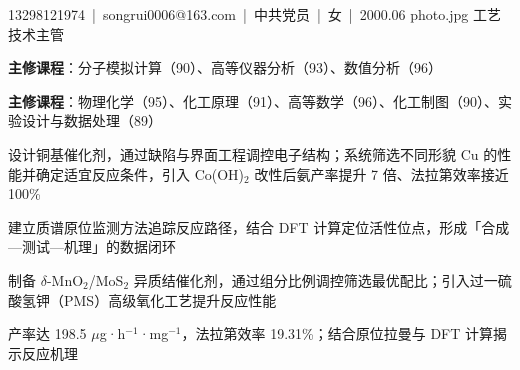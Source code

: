 \newcommand{\tighten}{%
  \linespread{1.0}\selectfont
  \setlist[itemize]{itemsep=0.0em,topsep=0.02em,parsep=0pt}%
  \setlength{\parskip}{0pt}%
}




%
  {13298121974~|~songrui0006@163.com~|~中共党员~|~女~|~2000.06}%
  {photo.jpg}%
  {工艺技术主管}


\begin{bullets}
  \item \textbf{主修课程}：分子模拟计算（90）、高等仪器分析（93）、数值分析（96）
\end{bullets}

\begin{bullets}
  \item \textbf{主修课程}：物理化学（95）、化工原理（91）、高等数学（96）、化工制图（90）、实验设计与数据处理（89）
\end{bullets}


\begin{bullets}
  \item 设计铜基催化剂，通过缺陷与界面工程调控电子结构；系统筛选不同形貌 Cu 的性能并确定适宜反应条件，引入 Co(OH)$_2$ 改性后氨产率提升 7 倍、法拉第效率接近 100\%
  \item 建立质谱原位监测方法追踪反应路径，结合 DFT 计算定位活性位点，形成「合成—测试—机理」的数据闭环
\end{bullets}

\begin{bullets}
  \item 制备 $\delta$-MnO$_2$/MoS$_2$ 异质结催化剂，通过组分比例调控筛选最优配比；引入过一硫酸氢钾（PMS）高级氧化工艺提升反应性能
  \item 产率达 198.5 $\mu$g·h$^{-1}$·mg$^{-1}$，法拉第效率 19.31\%；结合原位拉曼与 DFT 计算揭示反应机理
\end{bullets}

